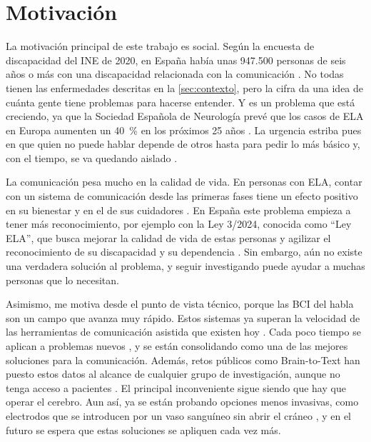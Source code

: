 \section{Motivación}
\label{sec:motivacion}
\label{sec:motivacion-general}

La motivación principal de este trabajo es social. Según la encuesta de discapacidad del INE de 2020, en España había unas 947.500 personas de seis años o más con una discapacidad relacionada con la comunicación \cite{ine2022edad}. No todas tienen las enfermedades descritas en la \cref{sec:contexto}, pero la cifra da una idea de cuánta gente tiene problemas para hacerse entender. Y es un problema que está creciendo, ya que la Sociedad Española de Neurología prevé que los casos de ELA en Europa aumenten un \SI{40}{\percent} en los próximos 25 años \cite{sen2026ela}. La urgencia estriba pues en que quien no puede hablar depende de otros hasta para pedir lo más básico y, con el tiempo, se va quedando aislado \cite{metzger2023}.

La comunicación pesa mucho en la calidad de vida. En personas con ELA, contar con un sistema de comunicación desde las primeras fases tiene un efecto positivo en su bienestar y en el de sus cuidadores \cite{londral2015}. En España este problema empieza a tener más reconocimiento, por ejemplo con la Ley 3/2024, conocida como \enquote{Ley ELA}, que busca mejorar la calidad de vida de estas personas y agilizar el reconocimiento de su discapacidad y su dependencia \cite{leyela2024}. Sin embargo, aún no existe una verdadera solución al problema, y seguir investigando puede ayudar a muchas personas que lo necesitan.

Asimismo, me motiva desde el punto de vista técnico, porque las BCI del habla son un campo que avanza muy rápido. Estos sistemas ya superan la velocidad de las herramientas de comunicación asistida que existen hoy \cite{silva2024speech}. Cada poco tiempo se aplican a problemas nuevos \cite{wairagkar2025}, y se están consolidando como una de las mejores soluciones para la comunicación. Además, retos públicos como Brain-to-Text han puesto estos datos al alcance de cualquier grupo de investigación, aunque no tenga acceso a pacientes \cite{b2t24lessons,b2t25}. El principal inconveniente sigue siendo que hay que operar el cerebro. Aun así, ya se están probando opciones menos invasivas, como electrodos que se introducen por un vaso sanguíneo sin abrir el cráneo \cite{oxley2021}, y en el futuro se espera que estas soluciones se apliquen cada vez más.


